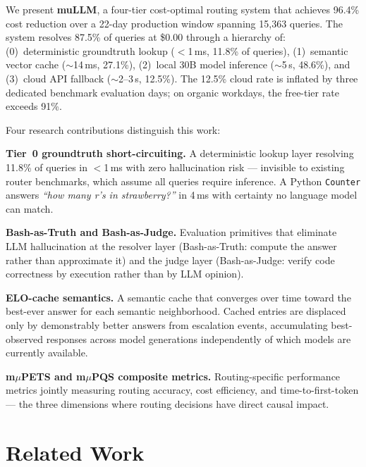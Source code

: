 \documentclass[11pt]{article}
\begin{document}
We present \textbf{muLLM}, a four-tier cost-optimal routing system that
achieves 96.4\% cost reduction over a 22-day production window spanning
15,363 queries. The system resolves 87.5\% of queries at \$0.00 through
a hierarchy of: (0)~deterministic groundtruth lookup ($<$1\,ms,
11.8\% of queries), (1)~semantic vector cache ($\sim$14\,ms, 27.1\%),
(2)~local 30B model inference ($\sim$5\,s, 48.6\%), and (3)~cloud API
fallback ($\sim$2--3\,s, 12.5\%). The 12.5\% cloud rate is inflated by
three dedicated benchmark evaluation days; on organic workdays, the
free-tier rate exceeds 91\%.

Four research contributions distinguish this work:

\textbf{Tier~0 groundtruth short-circuiting.} A deterministic lookup
layer resolving 11.8\% of queries in $<$1\,ms with zero hallucination
risk --- invisible to existing router benchmarks, which assume all
queries require inference. A Python \texttt{Counter} answers
\textit{``how many r's in strawberry?''} in 4\,ms with certainty no
language model can match.

\textbf{Bash-as-Truth and Bash-as-Judge.} Evaluation primitives that
eliminate LLM hallucination at the resolver layer (Bash-as-Truth:
compute the answer rather than approximate it) and the judge layer
(Bash-as-Judge: verify code correctness by execution rather than by
LLM opinion).

\textbf{ELO-cache semantics.} A semantic cache that converges over time
toward the best-ever answer for each semantic neighborhood. Cached
entries are displaced only by demonstrably better answers from
escalation events, accumulating best-observed responses across model
generations independently of which models are currently available.

\textbf{m$\mu$PETS and m$\mu$PQS composite metrics.} Routing-specific
performance metrics jointly measuring routing accuracy, cost efficiency,
and time-to-first-token --- the three dimensions where routing decisions
have direct causal impact.

\section{Related Work}
\end{document}
